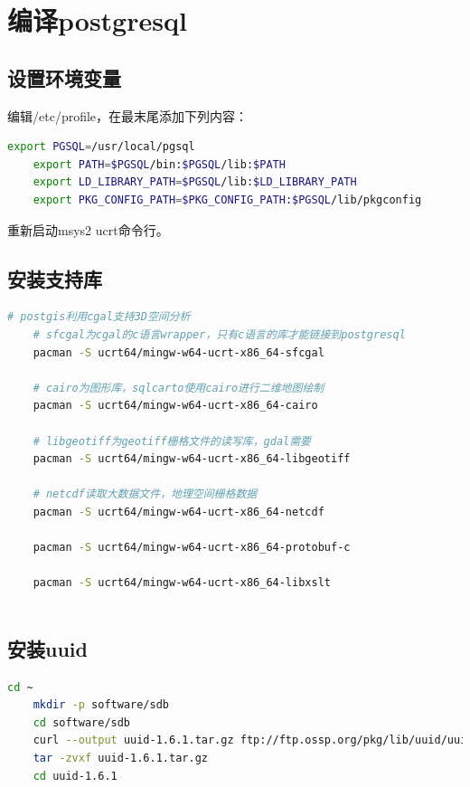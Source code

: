 \section{编译postgresql}
\subsection{设置环境变量}
编辑/etc/profile，在最末尾添加下列内容：
\begin{lstlisting}[backgroundcolor = \color{codebackground}, language=bash]
	export PGSQL=/usr/local/pgsql
	export PATH=$PGSQL/bin:$PGSQL/lib:$PATH
	export LD_LIBRARY_PATH=$PGSQL/lib:$LD_LIBRARY_PATH
	export PKG_CONFIG_PATH=$PKG_CONFIG_PATH:$PGSQL/lib/pkgconfig
\end{lstlisting}
重新启动msys2 ucrt命令行。

\subsection{安装支持库}

\begin{lstlisting}[backgroundcolor = \color{codebackground}, language=bash]
	# postgis利用cgal支持3D空间分析
	# sfcgal为cgal的c语言wrapper，只有c语言的库才能链接到postgresql
	pacman -S ucrt64/mingw-w64-ucrt-x86_64-sfcgal 
	
	# cairo为图形库，sqlcarto使用cairo进行二维地图绘制
	pacman -S ucrt64/mingw-w64-ucrt-x86_64-cairo 
	
	# libgeotiff为geotiff栅格文件的读写库，gdal需要
	pacman -S ucrt64/mingw-w64-ucrt-x86_64-libgeotiff 
	
	# netcdf读取大数据文件，地理空间栅格数据
	pacman -S ucrt64/mingw-w64-ucrt-x86_64-netcdf
	
	pacman -S ucrt64/mingw-w64-ucrt-x86_64-protobuf-c
	
	pacman -S ucrt64/mingw-w64-ucrt-x86_64-libxslt
	
\end{lstlisting}


\subsection{安装uuid}
\begin{lstlisting}[backgroundcolor = \color{codebackground}, language=bash]
	cd ~
	mkdir -p software/sdb
	cd software/sdb
	curl --output uuid-1.6.1.tar.gz ftp://ftp.ossp.org/pkg/lib/uuid/uuid-1.6.1.tar.gz
	tar -zvxf uuid-1.6.1.tar.gz
	cd uuid-1.6.1
\end{lstlisting}

